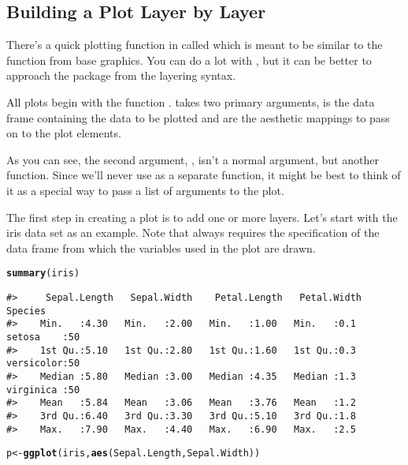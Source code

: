\documentclass{article}\usepackage[]{graphicx}\usepackage[usenames,dvipsnames]{color}
\makeatletter
\newcommand{\hlstd}[1]{\textcolor[rgb]{0.345,0.345,0.345}{#1}}%
\newcommand{\hlkwb}[1]{\textcolor[rgb]{0.69,0.353,0.396}{#1}}%
\newcommand{\hlkwd}[1]{\textcolor[rgb]{0.737,0.353,0.396}{\textbf{#1}}}%
\newenvironment{kframe}{%
 \def\at@end@of@kframe{}%
 \ifinner\ifhmode%
  \def\at@end@of@kframe{\end{minipage}}%
  \begin{minipage}{\columnwidth}%
 \fi\fi%
 \def\FrameCommand##1{\hskip\@totalleftmargin \hskip-\fboxsep
 \colorbox{shadecolor}{##1}\hskip-\fboxsep
     \hskip-\linewidth \hskip-\@totalleftmargin \hskip\columnwidth}%
 \MakeFramed {\advance\hsize-\width
   \@totalleftmargin\z@ \linewidth\hsize
   \@setminipage}}%
 {\par\unskip\endMakeFramed%
 \at@end@of@kframe}
\newenvironment{knitrout}{}{} %
\makeatother
\begin{document}
\subsection{Building a Plot Layer by Layer}

There's a quick plotting function in  called 
which is meant to be similar to the  function from base graphics. 
You can do a lot with , but it can be better to approach
the package from the layering syntax.

All  plots begin with the function . 
 takes two primary 
arguments,  is the data frame containing the data to be plotted
and  are the aesthetic mappings to pass on to the plot elements.

As you can see, the second argument, , isn't a normal argument, but another 
function. Since we'll never use  as a separate function, it might be best
to think of it as a special way to pass a list of arguments to the plot.

The first step in creating a plot is to add one or more layers. Let's start with 
the iris data set as an example. Note that  always requires the specification
of the data frame from which the variables used in the plot are drawn.


\begin{knitrout}
\color{fgcolor}\begin{kframe}
\begin{alltt}
    \hlkwd{summary}\hlstd{(iris)}
\end{alltt}
\begin{verbatim}
#>     Sepal.Length   Sepal.Width    Petal.Length   Petal.Width        Species  
#>    Min.   :4.30   Min.   :2.00   Min.   :1.00   Min.   :0.1   setosa    :50  
#>    1st Qu.:5.10   1st Qu.:2.80   1st Qu.:1.60   1st Qu.:0.3   versicolor:50  
#>    Median :5.80   Median :3.00   Median :4.35   Median :1.3   virginica :50  
#>    Mean   :5.84   Mean   :3.06   Mean   :3.76   Mean   :1.2                  
#>    3rd Qu.:6.40   3rd Qu.:3.30   3rd Qu.:5.10   3rd Qu.:1.8                  
#>    Max.   :7.90   Max.   :4.40   Max.   :6.90   Max.   :2.5
\end{verbatim}
\begin{alltt}
    \hlstd{p} \hlkwb{<-} \hlkwd{ggplot}\hlstd{(iris,} \hlkwd{aes}\hlstd{(Sepal.Length, Sepal.Width) )}
\end{alltt}
\end{kframe}
\end{knitrout}
\end{document}
